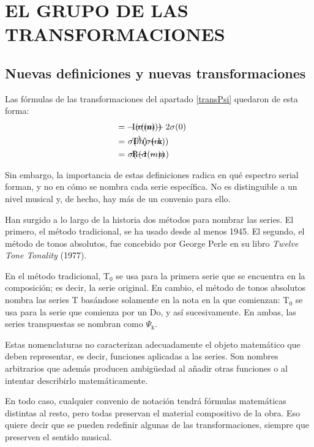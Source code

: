 \chapter{EL GRUPO DE LAS TRANSFORMACIONES}\label{ch:grupo}
	\section{Nuevas definiciones y nuevas transformaciones}
		\label{ciclico} 
		Las fórmulas de las transformaciones del apartado \ref{transPsi} quedaron de esta forma:
		\begin{align*}		
		&\text{I}(\sigma(m))\hspace*{-2.4cm}&=& -\sigma(m) + 2\sigma(0)\\
		&\text{T}^\text{k}(\sigma(m))\hspace*{-2.4cm}&=&\ \sigma(m) + \text{k}\\
		&\text{R}(\sigma(m))\hspace*{-2.4cm}&=&\ \sigma(-1-m)
		\end{align*}
			
		Sin embargo, la importancia de estas definiciones radica en qué espectro serial forman, y no en cómo se nombra cada serie específica. No es distinguible a un nivel musical y, de hecho, hay más de un convenio para ello.
		
		Han surgido a lo largo de la historia dos métodos para nombrar las series. El primero, el método tradicional, se ha usado desde al menos 1945. El segundo, el método de tonos absolutos, fue concebido por George Perle en su libro \emph{Twelve Tone Tonality} (1977).
		
		En el método tradicional, T$_0$ se usa para la primera serie que se encuentra en la composición; es decir, la serie original. En cambio, el método de tonos absolutos nombra las series T basándose solamente en la nota en la que comienzan: T$_0$ se usa para la serie que comienza por un Do, y así sucesivamente. En ambas, las series transpuestas se nombran como $\Psi_\text{k}$.
		
		Estas nomenclaturas no caracterizan adecuadamente el objeto matemático que deben representar, es decir, funciones aplicadas a las series. Son nombres arbitrarios que además producen ambigüedad al añadir otras funciones o al intentar describirlo matemáticamente.
		
		En todo caso, cualquier convenio de notación tendrá fórmulas matemáticas distintas al resto, pero todas preservan el material compositivo de la obra. Eso quiere decir que se pueden redefinir algunas de las transformaciones, siempre que preserven el sentido musical. 
		
